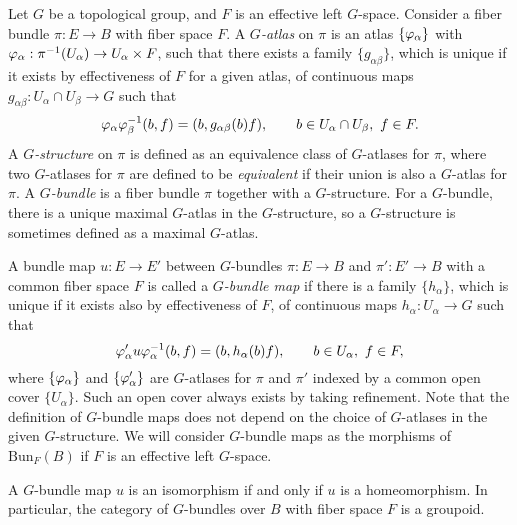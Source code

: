 \documentclass{../../large}
\begin{document}
\begin{prb}[$G$-bundles]
Let $G$ be a topological group, and $F$ is an effective left $G$-space.
Consider a fiber bundle $\pi:E\to B$ with fiber space $F$.
A \emph{$G$-atlas} on $\pi$ is an atlas $\{\varphi_\alpha\}$ with $\varphi_\alpha:\pi^{-1}(U_\alpha)\to U_\alpha\times F$, such that there exists a family $\{g_{\alpha\beta}\}$, which is unique if it exists by effectiveness of $F$ for a given atlas, of continuous maps $g_{\alpha\beta}:U_\alpha\cap U_\beta\to G$ such that
\[\varphi_\alpha\varphi_\beta^{-1}(b,f)=(b,g_{\alpha\beta}(b)f),
\qquad b\in U_\alpha\cap U_\beta,\ f\in F.\]
A \emph{$G$-structure} on $\pi$ is defined as an equivalence class of $G$-atlases for $\pi$, where two $G$-atlases for $\pi$ are defined to be \emph{equivalent} if their union is also a $G$-atlas for $\pi$.
A \emph{$G$-bundle} is a fiber bundle $\pi$ together with a $G$-structure.
For a $G$-bundle, there is a unique maximal $G$-atlas in the $G$-structure, so a $G$-structure is sometimes defined as a maximal $G$-atlas.

A bundle map $u:E\to E'$ between $G$-bundles $\pi:E\to B$ and $\pi':E'\to B$ with a common fiber space $F$ is called a \emph{$G$-bundle map} if there is a family $\{h_\alpha\}$, which is unique if it exists also by effectiveness of $F$, of continuous maps $h_\alpha:U_\alpha\to G$ such that
\[\varphi'_\alpha u\varphi_\alpha^{-1}(b,f)=(b,h_\alpha(b)f),\qquad b\in U_\alpha,\ f\in F,\]
where $\{\varphi_\alpha\}$ and $\{\varphi'_\alpha\}$ are $G$-atlases for $\pi$ and $\pi'$ indexed by a common open cover $\{U_\alpha\}$.
Such an open cover always exists by taking refinement.
Note that the definition of $G$-bundle maps does not depend on the choice of $G$-atlases in the given $G$-structure.
We will consider $G$-bundle maps as the morphisms of $\mathrm{Bun}_F(B)$ if $F$ is an effective left $G$-space.
\begin{parts}
\item A $G$-bundle map $u$ is an isomorphism if and only if $u$ is a homeomorphism. In particular, the category of $G$-bundles over $B$ with fiber space $F$ is a groupoid.
\end{parts}
\end{prb}
\begin{pf}
\end{pf}
\end{document}

